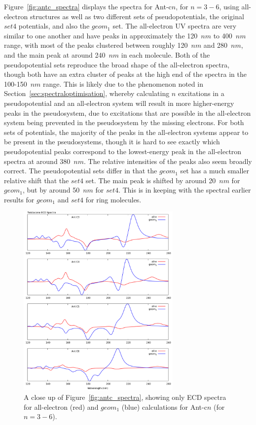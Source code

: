 \documentclass[aip,reprint,nofootinbib]{revtex4-1}
\begin{document}
Figure~\ref{fig:antc_spectra} displays the spectra for Ant-c$n$, for $n=3-6$, using all-electron structures as well as two different sets of pseudopotentials, the original $set4$ potentials, and also the $geom_1$ set. The all-electron UV spectra are very similar to one another and have peaks in approximately the 120~$nm$ to 400~$nm$ range, with most of the peaks clustered between roughly 120~$nm$ and 280~$nm$, and the main peak at around 240~$nm$ in each molecule. Both of the pseudopotential sets reproduce the broad shape of the all-electron spectra, though both have an extra cluster of peaks at the high end of the spectra in the 100-150~$nm$ range. This is likely due to the phenomenon noted in Section~\ref{sec:spectraloptimisation}, whereby calculating $n$ excitations in a pseudopotential and an all-electron system will result in more higher-energy peaks in the pseudosystem, due to excitations that are possible in the all-electron system being prevented in the pseudosystem by the missing electrons. For both sets of potentials, the majority of the peaks in the all-electron systems appear to be present in the pseudosystems, though it is hard to see exactly which pseudopotential peaks correspond to the lowest-energy peak in the all-electron spectra at around 380~$nm$. The relative intensities of the peaks also seem broadly correct. The pseudopotential sets differ in that the $geom_1$ set has a much smaller relative shift that the $set4$ set. The main peak is shifted by around 20~$nm$ for $geom_1$, but by around 50~$nm$ for $set4$. This is in keeping with the spectral earlier results for $geom_1$ and $set4$ for ring molecules.

\begin{figure}
\begin{center}
\includegraphics[width=8cm]{twistacene_spectra_zoom}
\end{center}
\caption[Zoomed twistacene all-electron and $geom_1$ ECD spectra.]{A close up of Figure~\ref{fig:antc_spectra}, showing only ECD spectra for all-electron (red) and $geom_1$ (blue) calculations for  Ant-c$n$ (for $n=3-6$).}\label{fig:antc_spectra_zoom}
\end{figure}
\end{document}
